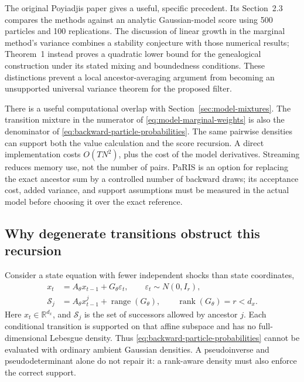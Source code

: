 \documentclass[11pt]{article}
\newcommand{\R}{\mathbb{R}}
\begin{document}
The original Poyiadjis paper gives a useful, specific precedent. Its
Section~2.3 compares the methods against an analytic Gaussian-model score
using 500 particles and 100 replications. The discussion of linear growth in
the marginal method's variance combines a stability conjecture with those
numerical results; Theorem~1 instead proves a quadratic lower bound for the
genealogical construction under its stated mixing and boundedness conditions.
These distinctions prevent a local ancestor-averaging argument from becoming
an unsupported universal variance theorem for the proposed filter.

There is a useful computational overlap with
Section~\ref{sec:model-mixtures}. The transition mixture in the numerator
of \eqref{eq:model-marginal-weights} is also the denominator of
\eqref{eq:backward-particle-probabilities}. The same pairwise densities can
support both the value calculation and the score recursion. A direct
implementation costs $O(TN^2)$, plus the cost of the model derivatives.
Streaming reduces memory use, not the number of pairs. PaRIS is an option
for replacing the exact ancestor sum by a controlled number of backward
draws; its acceptance cost, added variance, and support assumptions must be
measured in the actual model before choosing it over the exact reference.

\subsection{Why degenerate transitions obstruct this recursion}
\label{sec:fisher-degenerate}

Consider a state equation with fewer independent shocks than state
coordinates,
\begin{align}
 x_t&=A_\theta x_{t-1}+G_\theta\varepsilon_t,
 \qquad \varepsilon_t\sim N(0,I_r),\\
 \mathcal S_j&=A_\theta x_{t-1}^j+\operatorname{range}(G_\theta),
 \qquad \operatorname{rank}(G_\theta)=r<d_x.
 \label{eq:degenerate-ancestor-supports}
\end{align}
Here $x_t\in\R^{d_x}$, and $\mathcal S_j$ is the set of successors allowed
by ancestor $j$. Each conditional transition is supported on that affine
subspace and has no full-dimensional Lebesgue density. Thus
\eqref{eq:backward-particle-probabilities} cannot be evaluated with ordinary
ambient Gaussian densities. A pseudoinverse and pseudodeterminant alone do
not repair it: a rank-aware density must also enforce the correct support.
\end{document}
